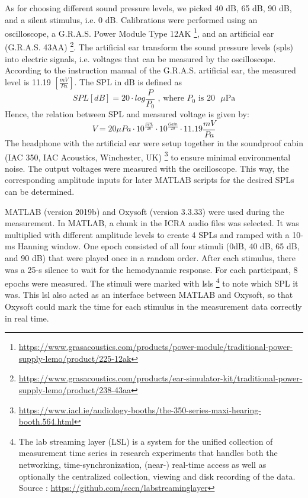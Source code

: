 As for choosing different sound pressure levels, we picked 40 dB, 65 dB, 90 dB, and a silent stimulus, i.e. 0 dB. Calibrations were performed using an oscilloscope, a G.R.A.S. Power Module Type 12AK \footnote {\url{https://www.grasacoustics.com/products/power-module/traditional-power-supply-lemo/product/225-12ak}},  and an artificial ear (G.R.A.S. 43AA) \footnote {\url {https://www.grasacoustics.com/products/ear-simulator-kit/traditional-power-supply-lemo/product/238-43aa}}. The artificial ear transform the sound pressure levels (\acrshort{spl}s) into electric signals, i.e. voltages that can be measured by the oscilloscope. According to the instruction manual of the G.R.A.S. artificial ear, the measured level is 11.19 $[ \frac {mV}{Pa}]$. The SPL in dB is defined as 
\begin{equation}
SPL [dB] = 20 \cdot log \frac{P}{P_0} \text{ , where $P_0$ is $20$  $\mu$Pa}
\end{equation}
Hence, the relation between SPL and measured voltage is given by:
\begin{equation}
V = 20{ \mu Pa} \cdot 10^{\frac {SPL}{20}}  \cdot 10^{\frac{Gain}{20}} \cdot 11.19 {\frac {mV}{Pa}} 
\end{equation}
The headphone with the artificial ear were setup together in the soundproof cabin (IAC 350, IAC Acoustics, Winchester, UK) \footnote{\url{https://www.iacl.ie/audiology-booths/the-350-series-maxi-hearing-booth.564.html}} to ensure minimal environmental noise. The output voltages were measured with the oscilloscope. This way, the corresponding amplitude inputs for later MATLAB scripts for the desired SPLs can be determined.

MATLAB (version 2019b) and Oxysoft (version 3.3.33) were used during the measurement. In MATLAB, a chunk in the ICRA audio files was selected. It was multiplied with different amplitude levels to create 4 SPLs and ramped with a 10-ms Hanning window. One epoch consisted of  all four stimuli (0dB, 40 dB, 65 dB, and 90 dB) that were played once in a random order. After each stimulus, there was a 25-s silence to wait for the hemodynamic response. For each participant, 8 epochs were measured. The stimuli were marked with \acrlong{lsl}s \footnote {The lab streaming layer (LSL) is a system for the unified collection of measurement time series in research experiments that handles both the networking, time-synchronization, (near-) real-time access as well as optionally the centralized collection, viewing and disk recording of the data. Source : \url{https://github.com/sccn/labstreaminglayer}} to note which SPL it was. This \acrlong {lsl} also acted as an interface between MATLAB and Oxysoft, so that Oxysoft could mark the time for each stimulus in the measurement data correctly in real time.

